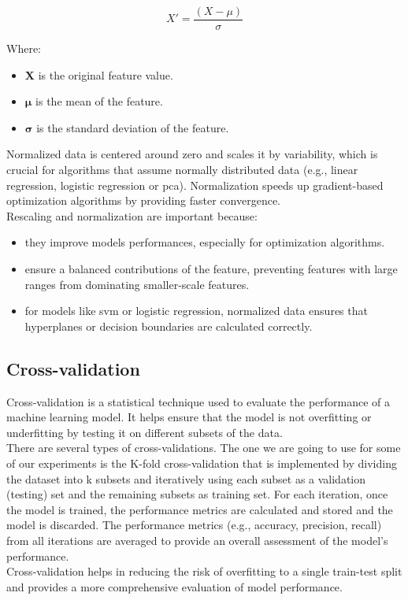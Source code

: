 \documentclass[11pt,a4paper]{article}
\begin{document}
\begin{displaymath}
X' = \frac{(X - \mu)}{\sigma}  
\end{displaymath}

Where:
\begin{itemize}
\item \textbf{X} is the original feature value.
\item $\boldsymbol{\mu}$ is the mean of the feature.
\item $\boldsymbol{\sigma}$ is the standard deviation of the feature. 
\end{itemize}
Normalized data is centered around zero and scales it by variability, which is crucial for algorithms that assume normally distributed data (e.g., linear regression, logistic regression or \acrfull{pca}). Normalization speeds up gradient-based optimization algorithms by providing faster convergence.
\\
Rescaling and normalization are important because:
\begin{itemize}
\item they improve models performances, especially for optimization algorithms.
\item ensure a balanced contributions of the feature, preventing features with large ranges from dominating smaller-scale features.
\item for models like \acrshort{svm} or logistic regression, normalized data ensures that hyperplanes or decision boundaries are calculated correctly.
\end{itemize}
\subsection{Cross-validation} 
Cross-validation is a statistical technique used to evaluate the performance of a machine learning model. It helps ensure that the model is not overfitting or underfitting by testing it on different subsets of the data.
\\
There are several types of cross-validations. The one we are going to use for some of our experiments is the K-fold cross-validation that is implemented by dividing the dataset into k subsets and iteratively using each subset as a validation (testing) set and the remaining subsets as training set. For each iteration, once the model is trained, the performance metrics are calculated and stored and the model is discarded. The performance metrics (e.g., accuracy, precision, recall) from all iterations are averaged to provide an overall assessment of the model's performance. 
\\
Cross-validation helps in reducing the risk of overfitting to a single train-test split and provides a more comprehensive evaluation of model performance.
\end{document}
